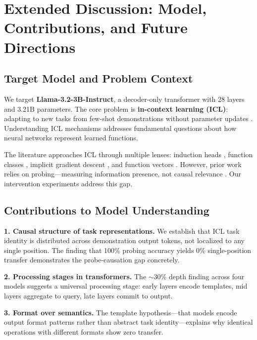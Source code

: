 \documentclass{article}
\begin{document}



\newpage
\section*{Extended Discussion: Model, Contributions, and Future Directions}

\subsection*{Target Model and Problem Context}

We target \textbf{Llama-3.2-3B-Instruct}, a decoder-only transformer with 28 layers and 3.21B parameters. The core problem is \textbf{in-context learning (ICL)}: adapting to new tasks from few-shot demonstrations without parameter updates \citep{brown2020language}. Understanding ICL mechanisms addresses fundamental questions about how neural networks represent learned functions.

The literature approaches ICL through multiple lenses: induction heads \citep{olsson2022context}, function classes \citep{garg2022can}, implicit gradient descent \citep{dai2022can,vonoswald2023transformers}, and function vectors \citep{todd2023function,hendel2023context}. However, prior work relies on probing---measuring information presence, not causal relevance \citep{belinkov2019analysis}. Our intervention experiments address this gap.

\subsection*{Contributions to Model Understanding}

\textbf{1. Causal structure of task representations.} We establish that ICL task identity is distributed across demonstration output tokens, not localized to any single position. The finding that 100\% probing accuracy yields 0\% single-position transfer demonstrates the probe-causation gap concretely.

\textbf{2. Processing stages in transformers.} The $\sim$30\% depth finding across four models suggests a universal processing stage: early layers encode templates, mid layers aggregate to query, late layers commit to output.

\textbf{3. Format over semantics.} The template hypothesis---that models encode output format patterns rather than abstract task identity---explains why identical operations with different formats show zero transfer.
\end{document}
